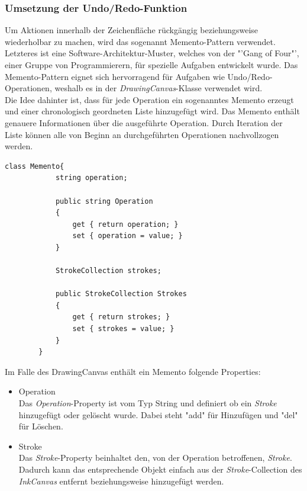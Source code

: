 \subsubsection{Umsetzung der Undo/Redo-Funktion}
Um Aktionen innerhalb der Zeichenfläche rückgängig beziehungsweise wiederholbar zu machen, wird das sogenannt Memento-Pattern verwendet. Letzteres ist eine Software-Architektur-Muster, welches von der "'Gang of Four"', einer Gruppe von Programmierern, für spezielle Aufgaben entwickelt wurde. Das Memento-Pattern eignet sich hervorragend für Aufgaben wie Undo/Redo-Operationen, weshalb es in der \textit{DrawingCanvas}-Klasse verwendet wird.\\
Die Idee dahinter ist, dass für jede Operation ein sogenanntes Memento erzeugt und einer chronologisch geordneten Liste hinzugefügt wird. Das Memento enthält genauere Informationen über die ausgeführte Operation. Durch Iteration der Liste können alle von Beginn an durchgeführten Operationen nachvollzogen werden.\\
\begin{lstlisting}[language = CSharp, captionpos=b, caption={Die Memento-Klasse}]
class Memento{
            string operation;

            public string Operation
            {
                get { return operation; }
                set { operation = value; }
            }

            StrokeCollection strokes;

            public StrokeCollection Strokes
            {
                get { return strokes; }
                set { strokes = value; }
            }
        }
\end{lstlisting}
Im Falle des DrawingCanvas enthält ein Memento folgende Properties:
\begin{itemize}
\item Operation\\
Das \textit{Operation}-Property ist vom Typ String und definiert ob ein \textit{Stroke} hinzugefügt oder gelöscht wurde. Dabei steht "add" für Hinzufügen und "del" für Löschen.
\item Stroke\\
Das \textit{Stroke}-Property beinhaltet den, von der Operation betroffenen, \textit{Stroke}. Dadurch kann das entsprechende Objekt einfach aus der \textit{Stroke}-Collection des \textit{InkCanvas} entfernt beziehungsweise hinzugefügt werden.
\end{itemize}

